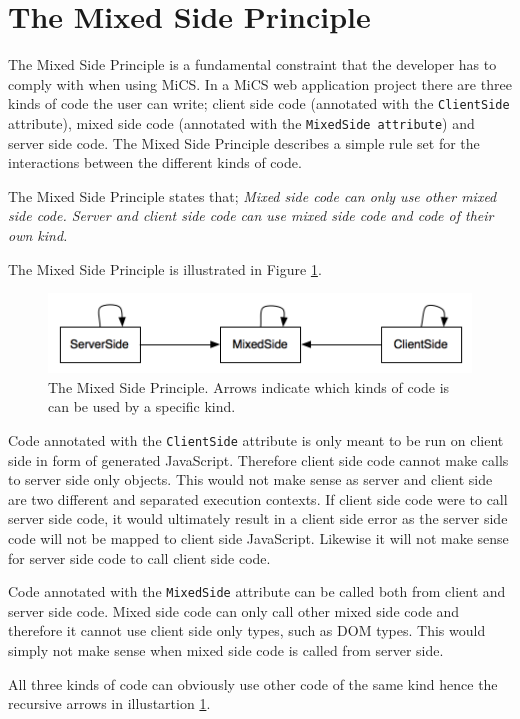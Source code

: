 	\section{The Mixed Side Principle} %
	\label{sub:the_mixedside_principle}
		The Mixed Side Principle is a fundamental constraint that the developer has to comply with when using MiCS. In a MiCS web application project there are three kinds of code the user can write; client side code (annotated with the \texttt{ClientSide} attribute), mixed side code (annotated with the \texttt{MixedSide attribute}) and server side code. The Mixed Side Principle describes a simple rule set for the interactions between the different kinds of code. 

		The Mixed Side Principle states that; \emph{Mixed side code can only use other mixed side code. Server and client side code can use mixed side code and code of their own kind.}

		The Mixed Side Principle is illustrated in Figure \ref{fig:MixedSidePrinciple}.

		\begin{figure}[H]
			\begin{center}
				\centerline{\includegraphics[width=12cm]{resources/images/MixedSidePrinciple.png}}
			\end{center}
			\caption{The Mixed Side Principle. Arrows indicate which kinds of code is can be used by a specific kind.}
			\label{fig:MixedSidePrinciple}
		\end{figure}

		Code annotated with the \texttt{ClientSide} attribute is only meant to be run on client side in form of generated JavaScript. Therefore client side code cannot make calls to server side only objects. This would not make sense as server and client side are two different and separated execution contexts.  If client side code were to call server side code, it would ultimately result in a client side error as the server side code will not be mapped to client side JavaScript. Likewise it will not make sense for server side code to call client side code.

		Code annotated with the \texttt{MixedSide} attribute can be called both from client and server side code. Mixed side code can only call other mixed side code and therefore it cannot use client side only types, such as DOM types. This would simply not make sense when mixed side code is called from server side.

		All three kinds of code can obviously use other code of the same kind hence the recursive arrows in illustartion \ref{fig:MixedSidePrinciple}.